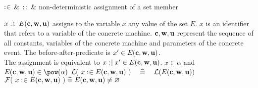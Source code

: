 \begin{rrnames}
  $\mathrel{:\mkern1mu\in}$ & \texttt{::} & non-deterministic assignment of a set member
\end{rrnames}
\begin{rodinrefentry}
  \rrdesc
    $x \mathrel{:\mkern1mu\in} E_{}(\mathbf{c},\mathbf{w},\mathbf{u})$ assigns to the variable $x$ any value of the
    set $E$. $x$ is an identifier that refers to a variable
    of the concrete machine.
    $\mathbf{c},\mathbf{w},\mathbf{u}$ represent the sequence of all constants, 
    variables of the concrete machine and parameters of the concrete event.
  \rrdef
    The before-after-predicate is $x' \in E_{}(\mathbf{c},\mathbf{w},\mathbf{u})$. \\
    The assignment is equivalent to
    $x \mathrel{:\mkern1mu\mid} x' \in E_{}(\mathbf{c},\mathbf{w},\mathbf{u})$.
  \rrtypes
    $x\in\alpha$ and $\eventbassignmentexpr{}\in\pow(\alpha)$
  \rrwd
    $\mathcal{L}(~x \mathrel{:\mkern1mu\in}E_{}(\mathbf{c},\mathbf{w},\mathbf{u})~)
    \quad\mathrel{\widehat=}\quad
    \mathcal{L}(E(\mathbf{c},\mathbf{w},\mathbf{u}))$
  \rrfis
    $\mathcal{F}(~x \mathrel{:\mkern1mu\in} E_{}(\mathbf{c},\mathbf{w},\mathbf{u})~) \mathrel{\widehat=} E_{}(\mathbf{c},\mathbf{w},\mathbf{u})\neq\mathord\varnothing$
\end{rodinrefentry}

